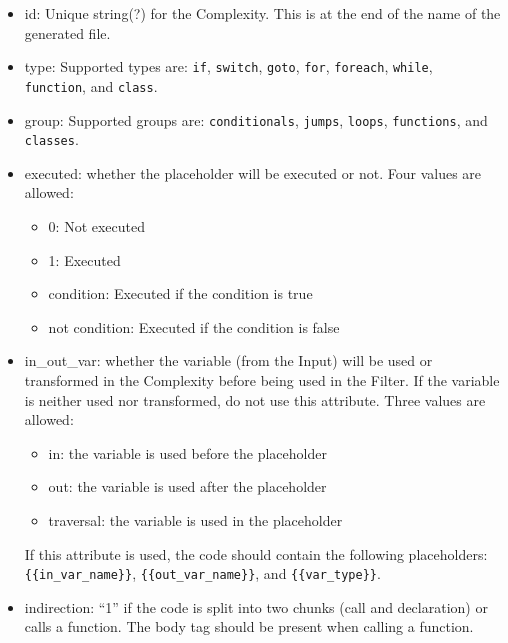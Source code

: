 \documentclass[12pt]{article}
\begin{document}
\begin{itemize}
    \item id: Unique string(?) for the Complexity.  This is at the 
    end of the
    name of the generated file.

    \item type: Supported types are: \verb|if|, \verb|switch|, \verb|goto|, 
    \verb|for|, \verb|foreach|, \verb|while|, \\
    \verb|function|, and \verb|class|.

    \item group: Supported groups are: \verb|conditionals|, \verb|jumps|, 
    \verb|loops|, \verb|functions|, and \\ \verb|classes|.

    \item executed: whether the placeholder will be executed or not. Four 
    values are allowed:
    \begin{itemize}
        \item 0: Not executed
        \item 1: Executed
        \item condition:  Executed if the condition is true
        \item not condition:  Executed if the condition is false
    \end{itemize}

    \item in\_out\_var: whether the variable (from the Input) will be used or
    transformed in the Complexity before being used in the Filter.  If the
    variable is neither used nor transformed, do not use this attribute.
    Three values are allowed:
    \begin{itemize}
        \item in: the variable is used before the placeholder 
        \item out: the variable is used after the placeholder
        \item traversal: the variable is used in the placeholder
    \end{itemize}
    If this attribute is used, the code should contain the following 
    placeholders: \\
    \verb|{{in_var_name}}|, \verb|{{out_var_name}}|, and \verb|{{var_type}}|.

    \item indirection: ``1'' if the code is split into two chunks (call and
    declaration) or calls a function.  The body tag should be present when 
    calling a function.


\end{itemize}
\end{document}
